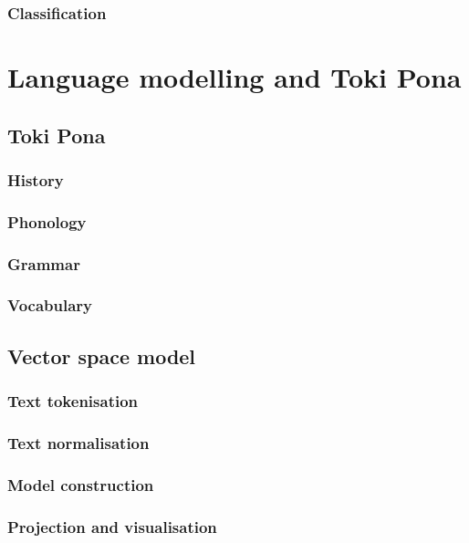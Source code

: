 \documentclass[14pt, a4paper]{extreport}
\begin{document}
\subsection{Classification}


\chapter{Language modelling and Toki Pona}

\section{Toki Pona}

\subsection{History}

\subsection{Phonology}

\subsection{Grammar}

\subsection{Vocabulary}

\section{Vector space model}

\subsection{Text tokenisation}

\subsection{Text normalisation}

\subsection{Model construction}

\subsection{Projection and visualisation}
\end{document}
